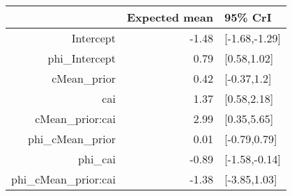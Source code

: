 \begin{tabular}{rrl}
  \hline
 & Expected mean & 95\% CrI \\ 
  \hline
Intercept & -1.48 & [-1.68,-1.29] \\ 
  phi\_Intercept & 0.79 & [0.58,1.02] \\ 
  cMean\_prior & 0.42 & [-0.37,1.2] \\ 
  cai & 1.37 & [0.58,2.18] \\ 
  cMean\_prior:cai & 2.99 & [0.35,5.65] \\ 
  phi\_cMean\_prior & 0.01 & [-0.79,0.79] \\ 
  phi\_cai & -0.89 & [-1.58,-0.14] \\ 
  phi\_cMean\_prior:cai & -1.38 & [-3.85,1.03] \\ 
   \hline
\end{tabular}


